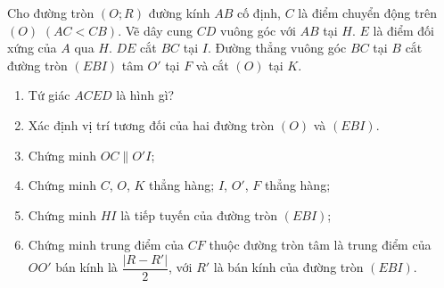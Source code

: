 	
\begin{bt}%
	Cho đường tròn $(O;R)$ đường kính $AB$ cố định, $C$ là điểm chuyển động trên $(O)$ $(AC<CB)$. Vẽ dây cung $CD$ vuông góc với $AB$ tại $H$. $E$ là điểm đối xứng của $A$ qua $H$. $DE$ cắt $BC$ tại $I$. Đường thẳng vuông góc $BC$ tại $B$ cắt đường tròn $(EBI)$ tâm $O'$ tại $F$ và cắt $(O)$ tại $K$.
	\begin{enumerate}
		\item Tứ giác $ACED$ là hình gì?
		\item Xác định vị trí tương đối của hai đường tròn $(O)$ và $(EBI)$.
		\item Chứng minh $OC\parallel O'I$;
		\item Chứng minh $C$, $O$, $K$ thẳng hàng; $I$, $O'$, $F$ thẳng hàng;
		\item Chứng minh $HI$ là tiếp tuyến của đường tròn $(EBI)$;
		\item Chứng minh trung điểm của $CF$ thuộc đường tròn tâm là trung điểm của $OO'$ bán kính là $\dfrac{|R-R'|}{2}$, với $R'$ là bán kính của đường tròn $(EBI)$.
	\end{enumerate}
\end{bt}
